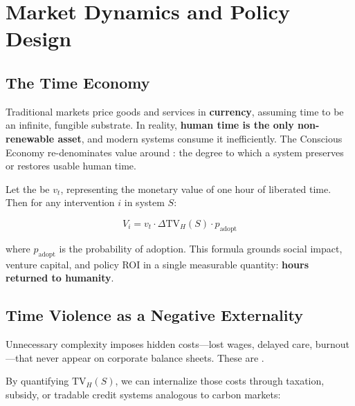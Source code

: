 
\section{Market Dynamics and Policy Design}
\label{sec:markets}

\subsection{The Time Economy}
\label{sec:time-economy}

Traditional markets price goods and services in \textbf{currency}, assuming time to be an infinite, fungible substrate. In reality, \textbf{human time is the only non-renewable asset}, and modern systems consume it inefficiently. The Conscious Economy re-denominates value around : the degree to which a system preserves or restores usable human time.

Let the  be $v_t$, representing the monetary value of one hour of liberated time. Then for any intervention $i$ in system $S$:

\begin{equation}
\label{eq:value-intervention}
V_i = v_t \cdot \Delta \text{TV}_H(S) \cdot p_{\text{adopt}}
\end{equation}

where $p_{\text{adopt}}$ is the probability of adoption. This formula grounds social impact, venture capital, and policy ROI in a single measurable quantity: \textbf{hours returned to humanity}.

\subsection{Time Violence as a Negative Externality}
\label{sec:negative-externality}

Unnecessary complexity imposes hidden costs—lost wages, delayed care, burnout—that never appear on corporate balance sheets. These are .

By quantifying $\text{TV}_H(S)$, we can internalize those costs through taxation, subsidy, or tradable credit systems analogous to carbon markets:

